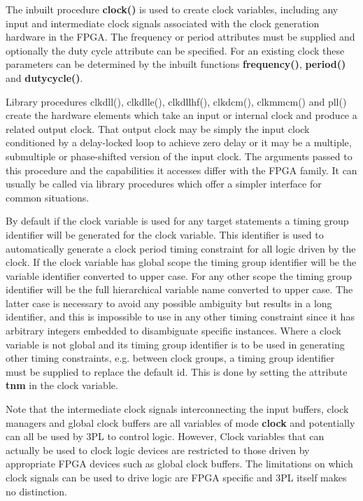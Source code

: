             The inbuilt procedure {\bf clock()} is used to create clock
            variables, including any input and intermediate clock signals
            associated with the clock generation hardware in the FPGA.
            The frequency or period attributes must be supplied
            and optionally the duty cycle attribute can be specified. For an
            existing clock these parameters can be determined by the
            inbuilt functions {\bf frequency()}, {\bf period()} and
            {\bf dutycycle()}.
            
            Library procedures clkdll(), clkdlle(), clkdllhf(), clkdcm(), clkmmcm()
            and pll() create the hardware elements which take an input or
            internal clock and produce a related output clock. That output clock
            may be simply the input clock conditioned by a delay-locked loop to
            achieve zero delay or it may be a multiple, submultiple or
            phase-shifted version of the input clock. The arguments passed to
            this procedure and the capabilities it accesses differ with the FPGA
            family. It can usually be called via library procedures which offer
            a simpler interface for common situations.
        
            By default if the clock variable is used for any target
            statements a timing group identifier will be generated for the clock
            variable. This identifier is used to automatically generate a clock
            period timing constraint for all logic driven by the clock. If the
            clock variable has global scope the timing group identifier will be the
            variable identifier converted to upper case. For any other scope the
            timing group identifier will be the full hierarchical variable name
            converted to upper case. The latter case is necessary to avoid any
            possible ambiguity but results in a long identifier, and this is
            impossible to use in any other timing constraint since it has arbitrary
            integers embedded to disambiguate specific instances. Where a clock
            variable is not global and its timing group identifier is to be used in
            generating other timing constraints, e.g. between clock groups, a
            timing group identifier must be supplied to replace the default id.
            This is done by setting the attribute {\bf tnm} in the
            clock variable.
            
            Note that the intermediate clock signals interconnecting the input
            buffers, clock managers and global clock buffers are all variables
            of mode {\bf clock} and potentially can all be used by 3PL to
            control logic. However, Clock variables that can actually be used to clock
            logic devices are restricted to those driven by
            appropriate FPGA devices such as global clock buffers. The
            limitations on which clock signals can be used to drive logic are
            FPGA specific and 3PL itself makes no distinction.
            

